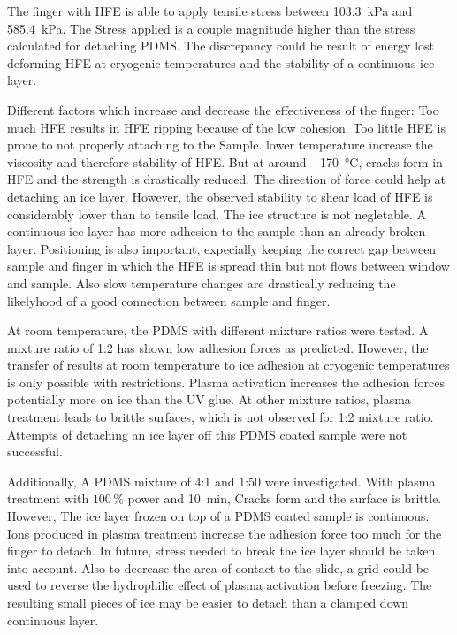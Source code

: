 The finger with HFE is able to apply tensile stress between \SI{103.3}{\kilo\pascal} and \SI{585.4}{\kilo\pascal}. The Stress applied is a couple magnitude higher than the stress calculated for detaching PDMS. The discrepancy could be result of energy lost deforming HFE at cryogenic temperatures and the stability of a continuous ice layer.

Different factors which increase and decrease the effectiveness of the finger: Too much HFE results in HFE ripping because of the low cohesion. Too little HFE is prone to not properly attaching to the Sample. lower temperature increase the viscosity and therefore stability of HFE. But at around \SI{-170}{\degreeCelsius}, cracks form in HFE and the strength is drastically reduced. The direction of force could help at detaching an ice layer. However, the observed stability to shear load of HFE is considerably lower than to tensile load. The ice structure is not negletable. A continuous ice layer has more adhesion to the sample than an already broken layer. Positioning is also important, expecially keeping the correct gap between sample and finger in which the HFE is spread thin but not flows between window and sample. Also slow temperature changes are drastically reducing the likelyhood of a good connection between sample and finger.

At room temperature, the PDMS with different mixture ratios were tested. A mixture ratio of 1:2 has shown low adhesion forces as predicted. However, the transfer of results at room temperature to ice adhesion at cryogenic temperatures is only possible with restrictions. Plasma activation increases the adhesion forces potentially more on ice than the UV glue. At other mixture ratios, plasma treatment leads to brittle surfaces, which is not observed for 1:2 mixture ratio. Attempts of detaching an ice layer off this PDMS coated sample were not successful.

Additionally, A PDMS mixture of 4:1 and 1:50 were investigated. With plasma treatment with $100\,\%$ power and \SI{10}{\minute}, Cracks form and the surface is brittle. However, The ice layer frozen on top of a PDMS coated sample is continuous. Ions produced in plasma treatment increase the adhesion force too much for the finger to detach. In future, stress needed to break the ice layer should be taken into account. Also to decrease the area of contact to the slide, a grid could be used to reverse the hydrophilic effect of plasma activation before freezing. The resulting small pieces of ice may be easier to detach than a clamped down continuous layer.

